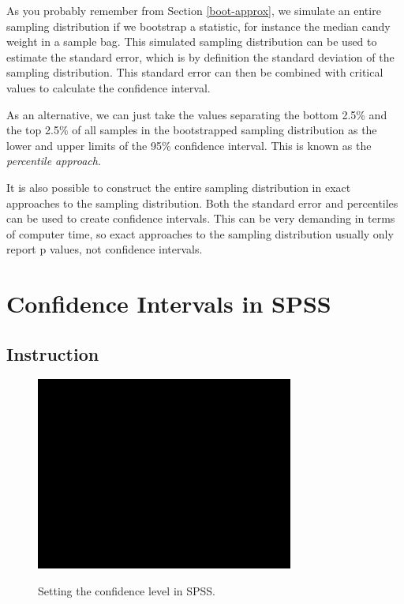 \documentclass[a4paper]{book}
\theoremstyle{definition}
\theoremstyle{definition}
\theoremstyle{definition}
\theoremstyle{remark}
\begin{document}
As you probably remember from Section \ref{boot-approx}, we simulate an
entire sampling distribution if we bootstrap a statistic, for instance
the median candy weight in a sample bag. This simulated sampling
distribution can be used to estimate the standard error, which is by
definition the standard deviation of the sampling distribution. This
standard error can then be combined with critical values to calculate
the confidence interval.

As an alternative, we can just take the values separating the bottom
2.5\% and the top 2.5\% of all samples in the bootstrapped sampling
distribution as the lower and upper limits of the 95\% confidence
interval. This is known as the \emph{percentile approach}.

It is also possible to construct the entire sampling distribution in
exact approaches to the sampling distribution. Both the standard error
and percentiles can be used to create confidence intervals. This can be
very demanding in terms of computer time, so exact approaches to the
sampling distribution usually only report p values, not confidence
intervals.

\section{Confidence Intervals in SPSS}\label{SPSS-CI}

\subsection{Instruction}\label{instruction}

\begin{figure}[H]
\href{https://www.youtube.com/embed/7e1gCCKYcW4}{\includegraphics[width=320px]{GentleIntro_files/figure-latex/SPSSconflevel-1} }\caption{Setting the confidence level in SPSS.}\label{fig:SPSSconflevel}
\end{figure}
\end{document}
